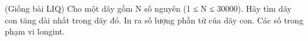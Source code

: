 (Giống bài LIQ) Cho một dãy gồm N số nguyên (1 ≤ N ≤ 30000). Hãy tìm dãy con tăng dài nhất trong dãy đó. In ra số lượng phần tử của dãy con. Các số trong phạm vi longint.  

\
